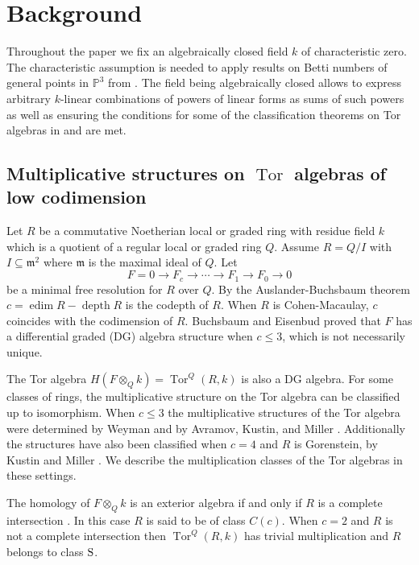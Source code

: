\documentclass[reqno]{amsart}
\DeclareMathOperator{\edim}{edim}
\DeclareMathOperator{\Tor}{Tor}
\DeclareMathOperator{\depth}{depth}
\newcommand{\sube}{\subseteq}
\renewcommand{\P}{\mathbb{P}}
\theoremstyle{plain} %
\theoremstyle{definition}
\theoremstyle{remark}
\begin{document}
\section{Background}



Throughout the paper we fix an algebraically closed field $k$ of characteristic zero. The characteristic assumption is needed to apply results on Betti numbers of general points in $\P^3$ from \cite{BGgenPts}. The field being algebraically closed allows to express arbitrary $k$-linear combinations of powers of linear forms as sums of such powers as well as ensuring the conditions for some of the classification theorems on Tor algebras in \cite{Kustin_Miller_Codepth4class} and \cite{Gor_Six_Gen} are met. 



\subsection{Multiplicative structures on $\Tor$ algebras of low codimension}\label{s: Tor classification}

Let $R$ be a commutative Noetherian  
local or graded
ring with residue field $k$ which is a quotient of a regular local or graded ring $Q$. Assume $R=Q/I$ with $I\sube \mathfrak{m}^2$ where $\mathfrak{m}$ is the maximal ideal of $Q$.
Let 
\[
F= 0\to F_c\to \cdots \to F_1\to  F_0\to 0
\]
be a minimal free resolution for $R$ over $Q$. By the Auslander-Buchsbaum theorem $c=\edim R-\depth R$ is the codepth of $R$.  When $R$ is Cohen-Macaulay, $c$ coincides with the codimension of $R$. Buchsbaum and Eisenbud \cite{BuchsbaumEisenbud} proved that $F$ has a differential graded (DG) algebra structure when $c\leq 3$, which is not necessarily unique. 

The Tor algebra $H(F\otimes_Q k)=\Tor^Q(R,k)$ is also a DG algebra. For some classes of rings, the multiplicative structure on the Tor algebra can be classified up to isomorphism.
When $c\leq 3$ the multiplicative structures of the Tor algebra were determined by Weyman \cite{Weyman} and by Avramov, Kustin, and Miller \cite{AKM-codepth3}. Additionally the structures have also been classified  when $c=4$ and $R$ is Gorenstein, by Kustin and Miller \cite{Kustin_Miller_Codepth4class}.   
We describe the multiplication classes of the Tor algebras in these settings. 

The homology of $F\otimes_Q k$ is an exterior algebra if and only if $R$ is a complete intersection \cite[Theorem 2.7]{Assmus}. In this case $R$ is said to be of class $C(c)$. When $c=2$ and $R$ is not a complete intersection then $\Tor^Q(R,k)$ has trivial multiplication and $R$ belongs  to class $\rm S$.
\end{document}
